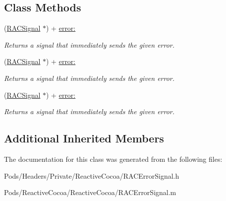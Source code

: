 \subsection*{Class Methods}
\begin{DoxyCompactItemize}
\item 
\mbox{\label{interface_r_a_c_error_signal_a485a8d10bb972a6294010ab3f4ae0452}} 
(\mbox{\hyperlink{interface_r_a_c_signal}{R\+A\+C\+Signal}} $\ast$) + \mbox{\hyperlink{interface_r_a_c_error_signal_a485a8d10bb972a6294010ab3f4ae0452}{error\+:}}
\begin{DoxyCompactList}\small\item\em Returns a signal that immediately sends the given error. \end{DoxyCompactList}\item 
\mbox{\label{interface_r_a_c_error_signal_a485a8d10bb972a6294010ab3f4ae0452}} 
(\mbox{\hyperlink{interface_r_a_c_signal}{R\+A\+C\+Signal}} $\ast$) + \mbox{\hyperlink{interface_r_a_c_error_signal_a485a8d10bb972a6294010ab3f4ae0452}{error\+:}}
\begin{DoxyCompactList}\small\item\em Returns a signal that immediately sends the given error. \end{DoxyCompactList}\item 
\mbox{\label{interface_r_a_c_error_signal_a485a8d10bb972a6294010ab3f4ae0452}} 
(\mbox{\hyperlink{interface_r_a_c_signal}{R\+A\+C\+Signal}} $\ast$) + \mbox{\hyperlink{interface_r_a_c_error_signal_a485a8d10bb972a6294010ab3f4ae0452}{error\+:}}
\begin{DoxyCompactList}\small\item\em Returns a signal that immediately sends the given error. \end{DoxyCompactList}\end{DoxyCompactItemize}
\subsection*{Additional Inherited Members}


The documentation for this class was generated from the following files\+:\begin{DoxyCompactItemize}
\item 
Pods/\+Headers/\+Private/\+Reactive\+Cocoa/R\+A\+C\+Error\+Signal.\+h\item 
Pods/\+Reactive\+Cocoa/\+Reactive\+Cocoa/R\+A\+C\+Error\+Signal.\+m\end{DoxyCompactItemize}
